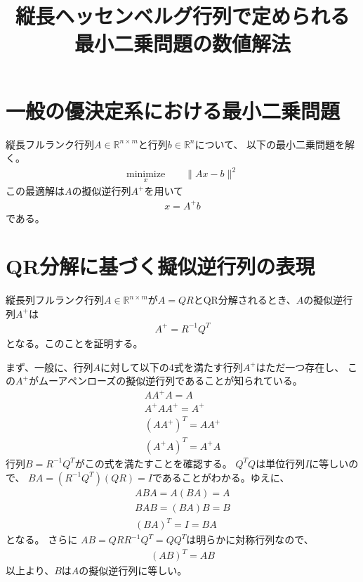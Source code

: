 \documentclass{jarticle}
\title{縦長ヘッセンベルグ行列で定められる\\最小二乗問題の数値解法}
\date{}
\begin{document}
\maketitle
\section{一般の優決定系における最小二乗問題}
縦長フルランク行列$A\in \mathbb{R}^{n\times m}$と行列$b\in\mathbb{R}^n$について、
以下の最小二乗問題を解く。
\begin{align}
\underset{x}{\textrm{minimize}} \hspace{2em}
\|Ax - b\|^2
\end{align}
この最適解は$A$の擬似逆行列$A^{+}$を用いて
\begin{align}
x = A^{+}b
\end{align}
である。

\section{QR分解に基づく擬似逆行列の表現}
縦長列フルランク行列$A\in \mathbb{R}^{n\times m}$が$A=QR$とQR分解されるとき、$A$の擬似逆行列$A^{+}$は
\begin{align}
A^{+} = R^{-1}Q^T
\end{align}
となる。このことを証明する。

まず、一般に、行列$A$に対して以下の4式を満たす行列$A^{+}$はただ一つ存在し、
この$A^{+}$がムーアペンローズの擬似逆行列であることが知られている。
\begin{align}
AA^{+}A = A
\\
A^{+}AA^{+} = A^{+}
\\
(AA^{+})^T = AA^{+}
\\
(A^{+}A)^T = A^{+}A
\end{align}
行列$B=R^{-1}Q^T$がこの式を満たすことを確認する。
$Q^TQ$は単位行列$I$に等しいので、
$BA=(R^{-1}Q^T)(QR)=I$であることがわかる。ゆえに、
\begin{align}
ABA = A(BA) = A
\\
BAB = (BA)B = B
\\
(BA)^T = I = BA
\end{align}
となる。
さらに
$AB=QRR^{-1}Q^T=QQ^T$は明らかに対称行列なので、
\begin{align}
(AB)^T = AB
\end{align}
以上より、$B$は$A$の擬似逆行列に等しい。

\newpage
\end{document}
